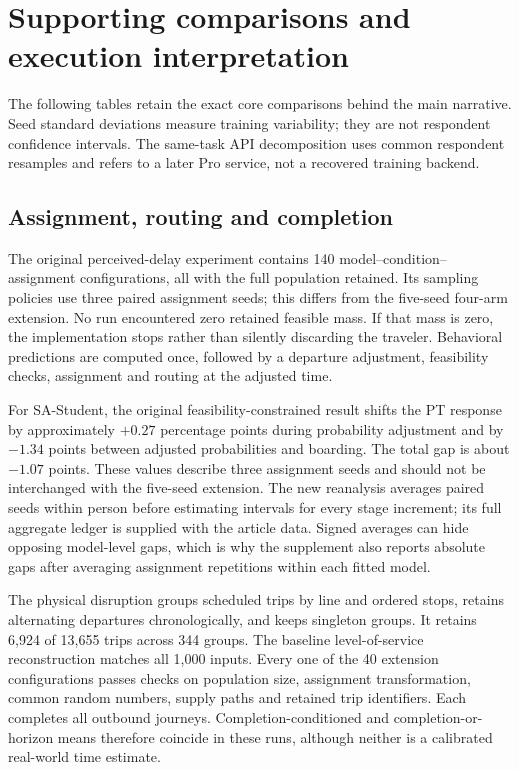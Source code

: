 \section{Supporting comparisons and execution interpretation}
\label{sec:core_tables}
The following tables retain the exact core comparisons behind the main narrative. Seed standard deviations measure training variability; they are not respondent confidence intervals. The same-task API decomposition uses common respondent resamples and refers to a later Pro service, not a recovered training backend.






\FloatBarrier
\subsection{Assignment, routing and completion}
\label{sec:execution_support}
The original perceived-delay experiment contains 140 model--condition--assignment configurations, all with the full population retained. Its sampling policies use three paired assignment seeds; this differs from the five-seed four-arm extension. No run encountered zero retained feasible mass. If that mass is zero, the implementation stops rather than silently discarding the traveler. Behavioral predictions are computed once, followed by a departure adjustment, feasibility checks, assignment and routing at the adjusted time.

For SA-Student, the original feasibility-constrained result shifts the PT response by approximately $+0.27$ percentage points during probability adjustment and by $-1.34$ points between adjusted probabilities and boarding. The total gap is about $-1.07$ points. These values describe three assignment seeds and should not be interchanged with the five-seed extension. The new reanalysis averages paired seeds within person before estimating intervals for every stage increment; its full aggregate ledger is supplied with the article data. Signed averages can hide opposing model-level gaps, which is why the supplement also reports absolute gaps after averaging assignment repetitions within each fitted model.

The physical disruption groups scheduled trips by line and ordered stops, retains alternating departures chronologically, and keeps singleton groups. It retains 6,924 of 13,655 trips across 344 groups. The baseline level-of-service reconstruction matches all 1,000 inputs. Every one of the 40 extension configurations passes checks on population size, assignment transformation, common random numbers, supply paths and retained trip identifiers. Each completes all outbound journeys. Completion-conditioned and completion-or-horizon means therefore coincide in these runs, although neither is a calibrated real-world time estimate.
